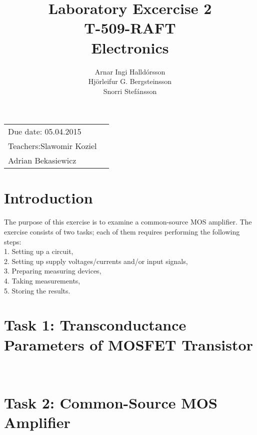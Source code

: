 \documentclass[11pt,a4paper]{article}
\title{Laboratory Excercise 2 \\ T-509-RAFT \\ Electronics} %
\author{Arnar Ingi Halldórsson \\ Hjörleifur G. Bergsteinsson \\ Snorri Stefánsson} %
\begin{document}
\maketitle %

\begin{tabular}{lr}
    Due date: 05.04.2015 \\
    Teachers:\qquad Slawomir Koziel\\ %
\qquad \qquad \qquad Adrian Bekasiewicz
\end{tabular}

\setlength\parindent{0pt} %

\renewcommand{\labelenumi}{\alph{enumi}.} %

\section*{Introduction}

    The  purpose  of  this  exercise  is to  examine a common-source MOS amplifier. The exercise consists of two tasks; each of them requires performing the following steps:\\
        1. Setting up a circuit,\\
        2. Setting up supply voltages/currents and/or input signals, \\
        3. Preparing measuring devices, \\
        4. Taking measurements, \\
        5. Storing the results. \\

\pagebreak

\section*{Task 1: Transconductance Parameters of MOSFET Transistor}
    
    
\mbox{}\\
    
\pagebreak

\section*{Task 2: Common-Source MOS Amplifier}
    
\end{document}
